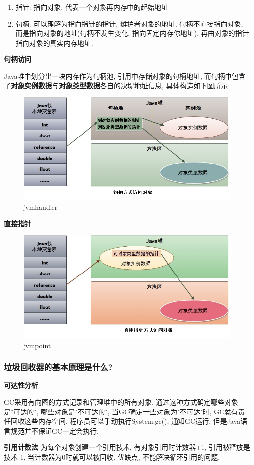 \begin{enumerate}
	\item 指针: 指向对象, 代表一个对象再内存中的起始地址
	\item 句柄: 可以理解为指向指针的指针, 维护者对象的地址. 句柄不直接指向对象, 而是指向对象的地址(句柄不发生变化, 指向固定内存你地址), 再由对象的指针指向对象的真实内存地址.
\end{enumerate}
\textbf{句柄访问}
\par
Java堆中划分出一块内存作为句柄池, 引用中存储对象的句柄地址, 而句柄中包含了\textbf{对象实例数据}与\textbf{对象类型数据}各自的决堤地址信息, 具体构造如下图所示:
\begin{figure}
	\centering
	\includegraphics[width=0.7\linewidth]{figures/jvm_handler.jpg}
	\caption{jvmhandler}
	\label{fig:jvm_handler}
\end{figure}
\textbf{直接指针}
\par
\begin{figure}
	\centering
	\includegraphics[width=0.7\linewidth]{figures/jvm_point.jpg}
	\caption{jvmpoint}
	\label{fig:jvm_point}
\end{figure}
\subsubsection{垃圾回收器的基本原理是什么?}
\textbf{可达性分析}
\par
GC采用有向图的方式记录和管理堆中的所有对象. 通过这种方式确定哪些对象是"可达的", 哪些对象是"不可达的", 当GC确定一些对象为"不可达"时, GC就有责任回收这些内存空间.
程序员可以手动执行System.gc(), 通知GC运行, 但是Java语言规范并不保证GC一定会执行.
\par
\textbf{引用计数法}
为每个对象创建一个引用技术, 有对象引用时计数器+1, 引用被释放是技术-1, 当计数器为0时就可以被回收. 优缺点, 不能解决循环引用的问题.
